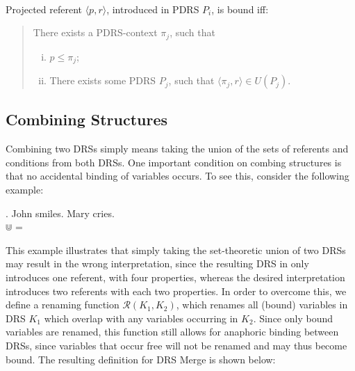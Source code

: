 \begin{definition}~\\
Projected referent $\langle p,r\rangle$, introduced in PDRS $P_i$, is bound
iff:
\begin{quote}
There exists a PDRS-context $\pi_j$, such that
\begin{enumerate}[i.]
  \item $p \leq \pi_j$; 
  \item There exists some PDRS $P_j$, such that 
    $\langle \pi_j,r\rangle \in U(P_j)$.
\end{enumerate}
\end{quote}
\end{definition}

\subsection{Combining Structures}

Combining two DRSs simply means taking the union of the sets of referents
and conditions from both DRSs. One important condition on combing structures
is that no accidental binding of variables occurs. To see this, consider the
following example:

\ex. John smiles. Mary cries.\\
   $\Cup$  = 

\noindent This example illustrates that simply taking the set-theoretic
union of two DRSs may result in the wrong interpretation, since the
resulting DRS in \Last only introduces one referent, with four properties,
whereas the desired interpretation introduces two referents with each two
properties. In order to overcome this, we define a renaming function
$\mathcal{R}(K_1,K_2)$, which renames all (bound) variables in DRS $K_1$
which overlap with any variables occurring in $K_2$. %
Since only bound variables are renamed, this function still allows for
anaphoric binding between DRSs, since variables that occur free will not be
renamed and may thus become bound. The resulting definition for DRS Merge is
shown below:

